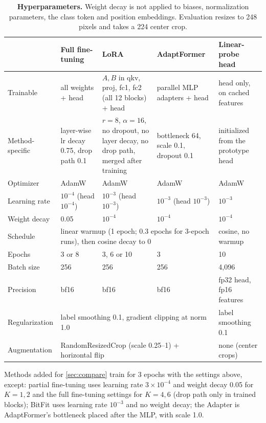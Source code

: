 \begin{table}[h]
  \centering
  \scriptsize
  \renewcommand{\arraystretch}{1.05}
  \begin{tabular}{@{}p{2.2cm}p{3.5cm}p{3.5cm}p{3.5cm}p{3.0cm}@{}}
    \toprule
    & Full fine-tuning & LoRA & AdaptFormer & Linear-probe head \\
    \midrule
    Trainable & all weights + head & $A, B$ in qkv, proj, fc1, fc2 (all 12 blocks) + head & parallel MLP adapters + head & head only, on cached features \\
    Method-specific & layer-wise lr decay 0.75, drop path 0.1 & $r=8$, $\alpha=16$, no dropout, no layer decay, no drop path, merged after training & bottleneck 64, scale 0.1, dropout 0.1 & initialized from the prototype head \\
    Optimizer & AdamW & AdamW & AdamW & AdamW \\
    Learning rate & $10^{-4}$ (head $10^{-4}$) & $10^{-3}$ (head $10^{-3}$) & $10^{-3}$ (head $10^{-3}$) & $10^{-3}$ \\
    Weight decay & 0.05 & $10^{-4}$ & $10^{-4}$ & $10^{-4}$ \\
    Schedule & \multicolumn{3}{p{11.3cm}}{linear warmup (1 epoch; 0.3 epochs for 3-epoch runs), then cosine decay to 0} & cosine, no warmup \\
    Epochs & 3 or 8 & 3, 6 or 10 & 3 & 10 \\
    Batch size & 256 & 256 & 256 & 4,096 \\
    Precision & bf16 & bf16 & bf16 & fp32 head, fp16 features \\
    Regularization & \multicolumn{3}{p{11.3cm}}{label smoothing 0.1, gradient clipping at norm 1.0} & label smoothing 0.1 \\
    Augmentation & \multicolumn{3}{p{11.3cm}}{RandomResizedCrop (scale 0.25--1) + horizontal flip} & none (center crops) \\
    \bottomrule
  \end{tabular}
  \caption{\textbf{Hyperparameters.} Weight decay is not applied to biases, normalization parameters, the class token and position embeddings. Evaluation resizes to 248 pixels and takes a 224 center crop.}
  \label{tab:hparams}
\end{table}

Methods added for \cref{sec:compare} train for 3 epochs with the settings above, except: partial fine-tuning uses learning rate $3{\times}10^{-4}$ and weight decay 0.05 for $K = 1, 2$ and the full fine-tuning settings for $K = 4, 6$ (drop path only in trained blocks); BitFit uses learning rate $10^{-3}$ and no weight decay; the Adapter is AdaptFormer's bottleneck placed after the MLP, with scale 1.0.
